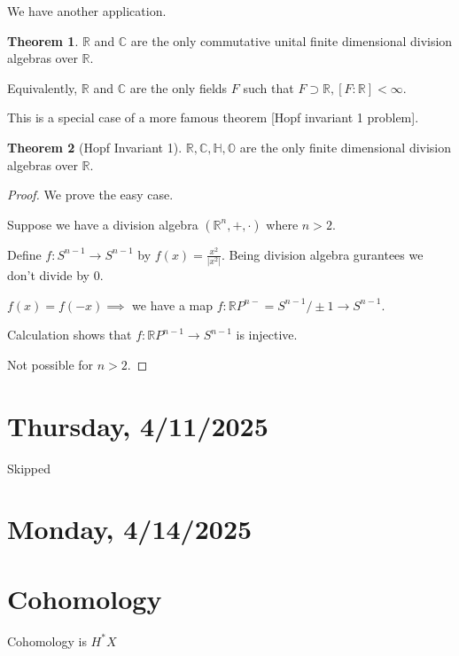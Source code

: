 \documentclass{article}
\theoremstyle{definition}
\newtheorem{theorem}{Theorem}
\begin{document}
    We have another application.

    \begin{theorem}
        \(\mathbb{R}\) and \(\mathbb{C}\) are the only commutative unital finite dimensional division algebras over \(\mathbb{R}\).

        Equivalently, \(\mathbb{R}\) and \(\mathbb{C}\) are the only fields \(F\) such that \(F \supset \mathbb{R}, [F:\mathbb{R}] < \infty\).
    \end{theorem}

    This is a special case of a more famous theorem [Hopf invariant 1 problem].

    \begin{theorem}
        [Hopf Invariant 1] \(\mathbb{R},\mathbb{C},\mathbb{H}, \mathbb{O}\) are the only finite dimensional division algebras over \(\mathbb{R}\).
    \end{theorem}

    \begin{proof}
        We prove the easy case.

        Suppose we have a division algebra \((\mathbb{R}^n, +, \cdot)\) where \(n > 2\).

        Define \(f: S^{n-1} \to S^{n-1}\) by \(f(x) = \frac{x^2}{\vert x^2 \vert}\). Being division algebra gurantees we don't divide by \(0\).
        
        \(f(x) = f(-x) \implies\) we have a map \(f:\mathbb{R} P^{n-}=S^{n-1} / \pm 1 \to S^{n-1}\).

        Calculation shows that \(f: \mathbb{R} P^{n-1} \to S^{n-1}\) is injective.

        Not possible for \(n > 2\).
    \end{proof}

    \section*{Thursday, 4/11/2025}

        Skipped

    \section*{Monday, 4/14/2025}
    
    \section*{Cohomology}

    Cohomology is \(H^{\ast} X\)
\end{document}
